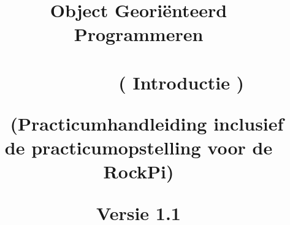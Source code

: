 \documentclass[12pt,openright,twoside]{report}
\date{}
\title{
	
	{\vspace{-4cm}}
	
	{\hspace{-20pt}\begin{bfseries}\LARGE{\color{black}Object Georiënteerd Programmeren  \\ ~ \\ ~~~~~~~~ ( Introductie )} \end{bfseries}  } 
	\newline ~ \newline
	\small{(Practicumhandleiding inclusief de practicumopstelling voor de RockPi)}
	\ThisCenterWallPaper{0.8}{figuren/frontRock.png}
	
	{Versie 1.1}
	
	{\vspace{12cm}}	
	{\color{white}  
		\raggedleft  \par}
	
}
\begin{document}
	
	
	\maketitle
	
	\tableofcontents
	
	\let\cleardoublepage\clearpage
	
	
	
	
	
	
	
	
	\begin{comment}
	\maketitle
	
	
	\tableofcontents
	
	\let\cleardoublepage\clearpage
	\let\cleardoublepage\clearpage
	
	
%	
	\let\cleardoublepage\relax
%	

	
	
	
	
	
	\end{comment}
\end{document}
